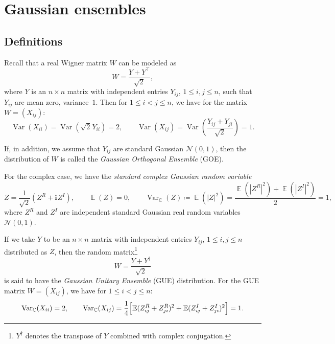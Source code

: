 \documentclass[letterpaper,11pt,oneside,reqno]{article}
\numberwithin{equation}{section}
\newcommand{\ssp}{\hspace{1pt}}
\theoremstyle{definition}
\begin{document}
\section{Gaussian ensembles}

\subsection{Definitions}
\label{sub:GOE_GUE_definitons}

Recall that a real Wigner matrix $W$ can be modeled as
\begin{equation*}
	W=\frac{Y+Y^\top}{\sqrt{2}},
\end{equation*}
where $Y$ is an $n\times n$ matrix with independent entries $Y_{ij}$,
$1\le i,j\le n$, such that $Y_{ij}$ are mean zero, variance~$1$.
Then for $1\le i<j\le n$, we have for the matrix
$W=(X_{ij})$:
\begin{equation*}
	\operatorname{\mathrm{Var}}\left( X_{ii} \right)=
	\operatorname{\mathrm{Var}}( \sqrt 2\ssp Y_{ii} )=2,\qquad
	\operatorname{\mathrm{Var}}\left( X_{ij} \right)=
	\operatorname{\mathrm{Var}}\left( \frac{Y_{ij}+Y_{ji}}{\sqrt 2} \right)=1.
\end{equation*}

If, in addition, we assume that $Y_{ij}$ are standard Gaussian
$\mathcal{N}(0,1)$, then the distribution of $W$ is called
the \emph{Gaussian Orthogonal Ensemble} (GOE).

For the complex case, we
have the \emph{standard complex Gaussian random variable}
\begin{equation*}
	Z=\frac{1}{\sqrt 2}\left( Z^R+\mathbf{i}\ssp Z^I \right),
	\qquad
	\operatorname{\mathbb{E}} (Z)=0,
	\qquad
	\operatorname{\mathrm{Var}}_{\mathbb{C}}(Z)\coloneqq
	\operatorname{\mathbb{E}} (|Z|^2)=
	\frac{
	\operatorname{\mathbb{E}} (|Z^R|^2)+
	\operatorname{\mathbb{E}} (|Z^I|^2)}{2}=1
	,
\end{equation*}
where $Z^R$ and $Z^I$ are independent
standard Gaussian real random variables $\mathcal{N}(0,1)$.

If we take $Y$ to be an $n\times n$ matrix with independent
entries $Y_{ij}$, $1\le i,j\le n$
distributed as $Z$, then the random matrix\footnote{$Y^\dagger$ denotes the transpose of $Y$ combined with complex conjugation.}
\begin{equation*}
	W=\frac{Y+Y^\dagger}{\sqrt 2}
\end{equation*}
is said to have the \emph{Gaussian Unitary Ensemble} (GUE) distribution.
For the GUE matrix $W=(X_{ij})$,
we have for $1\le i<j\le n$:
\begin{equation*}
	\operatorname{\mathrm{Var}}_{\mathbb{C}}(X_{ii})=2,
	\qquad
	\operatorname{\mathrm{Var}}_{\mathbb{C}}(X_{ij})
	=\frac{1}{4}
	\Bigl[ \operatorname{\mathbb{E}}(Z_{ij}^R
			+
		Z_{ji}^R)^2
		+
		\operatorname{\mathbb{E}}(Z_{ij}^I
			+
		Z_{ji}^I)^2
	\Bigr]
	=1.
\end{equation*}
\end{document}
